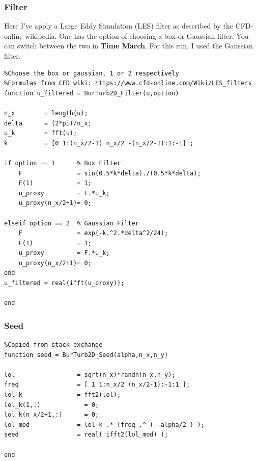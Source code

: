 \documentclass[12pt,twoside]{article}
\begin{document}
\newpage

\subsubsection{Filter} \label{sec:filter}

Here I've apply a Large Eddy Simulation (LES) filter as described by the CFD-online wikipedia. One has the option of choosing a box or Gaussian filter. You can switch between the two in \textbf{Time March}. For this run, I used the Gaussian filter.  

\vspace{50pt}

\begin{lstlisting}
%Choose the box or gaussian, 1 or 2 respectively
%Formulas from CFD wiki: https://www.cfd-online.com/Wiki/LES_filters
function u_filtered = BurTurb2D_Filter(u,option)

n_x        = length(u);
delta      = (2*pi)/n_x;
u_k        = fft(u);
k          = [0 1:(n_x/2-1) n_x/2 -(n_x/2-1):1:-1]';

if option == 1      % Box Filter
    F               = sin(0.5*k*delta)./(0.5*k*delta);
    F(1)            = 1;
    u_proxy         = F.*u_k;
    u_proxy(n_x/2+1)= 0;
    
elseif option == 2  % Gaussian Filter
    F               = exp(-k.^2.*delta^2/24);
    F(1)            = 1;
    u_proxy         = F.*u_k;
    u_proxy(n_x/2+1)= 0;
end
u_filtered = real(ifft(u_proxy));

end
\end{lstlisting}

\newpage

\subsubsection{Seed} \label{sec:seed}

\begin{lstlisting}
%Copied from stack exchange
function seed = BurTurb2D_Seed(alpha,n_x,n_y)

lol                 = sqrt(n_x)*randn(n_x,n_y);
freq                = [ 1 1:n_x/2 (n_x/2-1):-1:1 ];
lol_k               = fft2(lol);
lol_k(1,:)            = 0; 
lol_k(n_x/2+1,:)      = 0;  
lol_mod             = lol_k .* (freq .^ (- alpha/2 ) );
seed                = real( ifft2(lol_mod) );

end
\end{lstlisting}

\vspace{-30pt}
\end{document}
